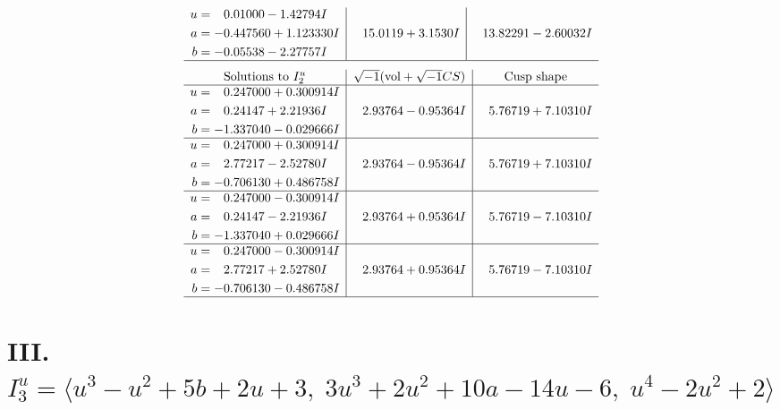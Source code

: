 \documentclass[1p]{elsarticle_modified}
\theoremstyle{definition}
\newcommand{\I}{\sqrt{-1}}
\begin{document}
$$\begin{array}{c|c|c}
\begin{aligned}
u &= \phantom{-}0.01000 - 1.42794 I \\
a &= -0.447560 + 1.123330 I \\
b &= -0.05538 - 2.27757 I\end{aligned}
 & \phantom{-}15.0119 + 3.1530 I & \phantom{-}13.82291 - 2.60032 I\\
 \hline 
 \end{array}$$\newpage$$\begin{array}{c|c|c}  
\text{Solutions to }I^u_{2}& \I (\text{vol} + \sqrt{-1}CS) & \text{Cusp shape}\\
 \hline 
\begin{aligned}
u &= \phantom{-}0.247000 + 0.300914 I \\
a &= \phantom{-}0.24147 + 2.21936 I \\
b &= -1.337040 - 0.029666 I\end{aligned}
 & \phantom{-}2.93764 - 0.95364 I & \phantom{-}5.76719 + 7.10310 I \\ \hline\begin{aligned}
u &= \phantom{-}0.247000 + 0.300914 I \\
a &= \phantom{-}2.77217 - 2.52780 I \\
b &= -0.706130 + 0.486758 I\end{aligned}
 & \phantom{-}2.93764 - 0.95364 I & \phantom{-}5.76719 + 7.10310 I \\ \hline\begin{aligned}
u &= \phantom{-}0.247000 - 0.300914 I \\
a &= \phantom{-}0.24147 - 2.21936 I \\
b &= -1.337040 + 0.029666 I\end{aligned}
 & \phantom{-}2.93764 + 0.95364 I & \phantom{-}5.76719 - 7.10310 I \\ \hline\begin{aligned}
u &= \phantom{-}0.247000 - 0.300914 I \\
a &= \phantom{-}2.77217 + 2.52780 I \\
b &= -0.706130 - 0.486758 I\end{aligned}
 & \phantom{-}2.93764 + 0.95364 I & \phantom{-}5.76719 - 7.10310 I\\
 \hline 
 \end{array}$$\newpage\newpage\renewcommand{\arraystretch}{1}
\centering \section*{III. $I^u_{3}= \langle u^3- u^2+5 b+2 u+3,\;3 u^3+2 u^2+10 a-14 u-6,\;u^4-2 u^2+2 \rangle$}
\end{document}

